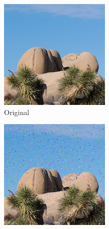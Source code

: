 \documentclass{article}
\begin{document}
\begin{figure}[htb]
    \centering
    \begin{subfigure}[b]{0.32\textwidth}
        \centering
        \includegraphics[width=\textwidth]{../Resource/cropped-image.png}
        \caption{Original}
        \label{fig:cropped-image-linear-original}
    \end{subfigure}
    \hfill
    \begin{subfigure}[b]{0.32\textwidth}
        \centering
        \includegraphics[width=\textwidth]{../Result/Linear/cropped-linear-bsc-output.png}

\end{subfigure}
\end{figure}
\end{document}
